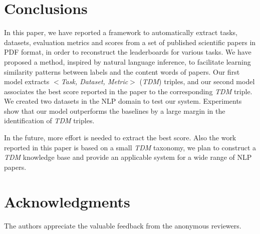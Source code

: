 \documentclass[11pt,a4paper]{article}
\begin{document}
\section{Conclusions}\label{sec:con}

In this paper, we have reported a framework to automatically extract tasks, datasets, evaluation metrics and scores from a set of published scientific  papers in PDF format, in order to reconstruct the leaderboards for various tasks.
We have proposed a method, inspired by natural language inference, to facilitate 
learning similarity patterns 
between labels and the content words of papers. Our first model extracts $<$\emph{Task, Dataset, Metric}$>$ (\emph{TDM}) triples, and our second model associates the best score reported in the paper to the corresponding \emph{TDM} triple. 
We created two datasets in the NLP domain to test our system. 
Experiments show that our model outperforms the baselines by a large margin in  the identification of \emph{TDM} triples. 

In the future, more effort is needed to extract the best score. 
Also the work reported in this paper is based on a small \emph{TDM} taxonomy, we plan to construct a \emph{TDM} knowledge base and provide an applicable system for a wide range of NLP papers. 




\section*{Acknowledgments}
The authors appreciate the valuable feedback from the anonymous reviewers.





\end{document}
